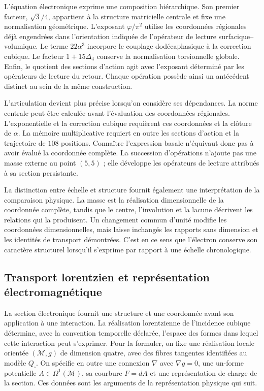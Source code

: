 L'équation électronique exprime une composition hiérarchique. Son premier
facteur, \(\sqrt3/4\), appartient à la structure matricielle centrale et fixe
une normalisation géométrique. L'exposant \(\varphi/\pi^2\) utilise les
coordonnées régionales déjà engendrées dans l'orientation indiquée de l'opérateur
de lecture surfacique--volumique. Le terme \(22\alpha^3\) incorpore le couplage
dodécaphasique à la correction cubique. Le facteur \(1+15\Delta_4\) conserve
la normalisation torsionnelle globale. Enfin, le quotient des sections
d'action agit avec l'exposant déterminé par les opérateurs de lecture du retour.
Chaque opération possède ainsi un antécédent distinct au sein de la même
construction.

L'articulation devient plus précise lorsqu'on considère ses dépendances.
La norme centrale peut être calculée avant l'évaluation des coordonnées
régionales. L'exponentielle et la correction cubique requièrent ces
coordonnées et la clôture de \(\alpha\). La mémoire multiplicative requiert
en outre les sections d'action et la trajectoire de \(108\) positions.
Connaître l'expression basale n'équivaut donc pas à avoir évalué la
coordonnée complète. La succession d'opérations n'ajoute pas une masse
externe au point \((5,5)\) ; elle développe les opérateurs de lecture attribués à sa
section persistante.

La distinction entre échelle et structure fournit également une
interprétation de la comparaison physique. La masse est la réalisation
dimensionnelle de la coordonnée complète, tandis que le centre, l'involution
et la lacune décrivent les relations qui la produisent. Un changement commun
d'unité modifie les coordonnées dimensionnelles, mais laisse inchangés
les rapports sans dimension et les identités de transport démontrées.
C'est en ce sens que l'électron conserve son caractère structurel
lorsqu'il s'exprime par rapport à une échelle chronologique.




\newpage
\subsection{Transport lorentzien et représentation électromagnétique}

La section électronique fournit une structure et une coordonnée
avant son application à une interaction. La réalisation lorentzienne
de l'incidence cubique détermine, avec la convention temporelle déclarée,
l'espace des formes dans lequel cette interaction peut s'exprimer.
Pour la formuler, on fixe une réalisation locale orientée \((\mathcal M,g)\)
de dimension quatre, avec des fibres tangentes identifiées au modèle
\(Q_\square\). On spécifie en outre une connexion \(\nabla\) avec
\(\nabla g=0\), une un-forme potentielle \(A\in\Omega^1(\mathcal M)\),
sa courbure \(F=dA\) et une représentation de charge de la section.
Ces données sont les arguments de la représentation physique qui suit.

